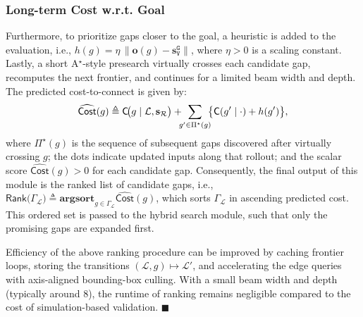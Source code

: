 \subsubsection{Long-term Cost w.r.t. Goal}
Furthermore, to prioritize gaps closer to the goal, a heuristic is added to the evaluation,
i.e.,
$h(g)=\eta\,\big\|\mathbf{o}(g)-\mathbf{s}_\texttt{V}^{\texttt{G}}\big\|$,
where $\eta>0$ is a scaling constant. Lastly, a short A$^\star$-style presearch virtually crosses
each candidate gap, recomputes the next frontier, and continues for a limited
beam width and depth. The predicted cost-to-connect is given by:
\begin{equation}\label{eq:pred_cost}
\widehat{\mathsf{Cost}}(g)\triangleq
\mathsf{C}\!\big(g \mid \mathcal{L},\mathbf{s}_{\mathcal{R}}\big)
+\!\!\!\sum_{g'\in\Pi^\star(g)}\!\!\!\big{\{}\mathsf{C}(g' \mid \cdot)+h(g')\big{\}},
\end{equation}
where $\Pi^\star(g)$ is the sequence of subsequent gaps discovered after
virtually crossing $g$;
the dots indicate updated inputs along that rollout;
and the scalar score $\widehat{\mathsf{Cost}}(g)>0$ for each candidate gap.
Consequently,
the final output of this module is the ranked list of candidate gaps, i.e.,
$\textsf{Rank}\big(\Gamma_\mathcal{L}\big)
\triangleq \textbf{argsort}_{g\in\Gamma_\mathcal{L}}\widehat{\mathsf{Cost}}(g)$,
which sorts $\Gamma_\mathcal{L}$ in ascending predicted cost. This
ordered set is passed to the hybrid search module, such that only the
promising gaps are expanded first.

\begin{remark}\label{remark:gap}
Efficiency of the above ranking procedure can be improved by
caching frontier loops, storing the transitions
$(\mathcal{L},g)\mapsto\mathcal{L}'$, and accelerating the edge queries with
axis-aligned bounding-box culling. With a small beam width and depth
(typically around $8$), the runtime of ranking remains negligible compared to
the cost of simulation-based validation. \hfill$\blacksquare$
\end{remark}




